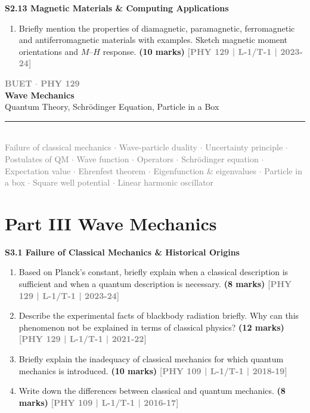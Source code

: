 \documentclass[12pt,a3paper]{article}
\newcommand{\yr}[1]{\hfill\textcolor{gray}{\small\textbf{[#1]}}}
\newcommand{\mk}[1]{\textcolor{orange!70!black}{\small\textbf{(#1 marks)}}}
\newcommand{\secdivider}[6]{%
  \newpage\thispagestyle{empty}%
  \vspace*{\fill}%
  \begin{tcolorbox}[enhanced,colback=#6!7,colframe=#5,boxrule=1.5pt,arc=8pt,
    left=20pt,right=20pt,top=22pt,bottom=22pt,
    shadow={3pt}{-3pt}{0pt}{black!15}]
    \centering
    {\large\textcolor{gray}{\textbf{BUET $\cdot$ PHY 129}}}\\[8pt]
    {\fontsize{22}{28}\selectfont\bfseries\textcolor{#5}{#2}}\\[6pt]
    {\fontsize{13}{17}\selectfont\textcolor{dgray}{#3}}\\[10pt]
    \textcolor{#5!60}{\rule{0.5\textwidth}{0.5pt}}\\[6pt]
    {\small\textcolor{gray}{#4}}
  \end{tcolorbox}%
  \vspace*{\fill}\newpage%
}
\newcommand{\subtopic}[2]{%
  \vspace{10pt}
  \noindent\begin{tcolorbox}[colback=#1!8,colframe=#1,boxrule=0.6pt,arc=4pt,
    left=6pt,right=6pt,top=4pt,bottom=4pt]
    \small\bfseries\textcolor{#1}{#2}
  \end{tcolorbox}
  \vspace{2pt}
}
\begin{document}
\label{sec:s213}
\subtopic{cA}{S2.13 \quad Magnetic Materials \& Computing Applications}

\begin{enumerate}

\item Briefly mention the properties of diamagnetic, paramagnetic, ferromagnetic and antiferromagnetic materials with examples. Sketch magnetic moment orientations and $M$--$H$ response.
\mk{10} \yr{PHY 129 | L-1/T-1 | 2023-24}

\end{enumerate}

\secdivider{Part III}{Wave Mechanics}%
  {Quantum Theory, Schr\"odinger Equation, Particle in a Box}%
  {Failure of classical mechanics $\cdot$ Wave-particle duality $\cdot$ Uncertainty principle $\cdot$ Postulates of QM $\cdot$ Wave function $\cdot$ Operators $\cdot$ Schr\"odinger equation $\cdot$ Expectation value $\cdot$ Ehrenfest theorem $\cdot$ Eigenfunction \& eigenvalues $\cdot$ Particle in a box $\cdot$ Square well potential $\cdot$ Linear harmonic oscillator}%
  {cC}{green}

\label{sec:S3}
\section*{Part III \quad Wave Mechanics}

\label{sec:s31}
\subtopic{cA}{S3.1 \quad Failure of Classical Mechanics \& Historical Origins}

\begin{enumerate}

\item Based on Planck's constant, briefly explain when a classical description is sufficient and when a quantum description is necessary.
\mk{8} \yr{PHY 129 | L-1/T-1 | 2023-24}

\item Describe the experimental facts of blackbody radiation briefly. Why can this phenomenon not be explained in terms of classical physics?
\mk{12} \yr{PHY 129 | L-1/T-1 | 2021-22}

\item Briefly explain the inadequacy of classical mechanics for which quantum mechanics is introduced.
\mk{10} \yr{PHY 109 | L-1/T-1 | 2018-19}

\item Write down the differences between classical and quantum mechanics.
\mk{8} \yr{PHY 109 | L-1/T-1 | 2016-17}

\end{enumerate}
\end{document}
